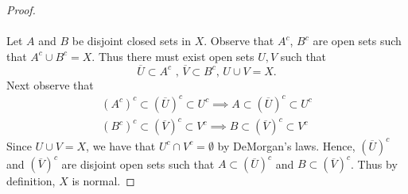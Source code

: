 \documentclass[a4paper,12pt,twoside]{hmcpset}
\begin{document}
\begin{proof}
\\
\\
Let $A$ and $B$ be disjoint closed sets in $X$. Observe that $A^c$,
$B^c$ are open sets such that $A^c \cup B^c = X$. Thus there must
exist open sets $U, V$ such that 
\[
  \overline{U} \subset A^c \text{ , } \overline{V} \subset B^c \text{, }
  U \cup V = X.  
\]
Next observe that 
\begin{gather*}
  (A^c)^c \subset (\overline{U})^c \subset U^c \implies A \subset (\overline{U})^c \subset U^c\\
  (B^c)^c \subset (\overline{V})^c \subset V^c \implies B \subset (\overline{V})^c \subset V^c 
\end{gather*}
Since $U \cup V = X$, we have that $U^c \cap V^c = \emptyset$ by
DeMorgan's laws. Hence, $(\overline{U})^c$ and $(\overline{V})^c$ are
disjoint open sets such that $A \subset (\overline{U})^c$ and 
$B \subset (\overline{V})^c$. Thus by definition, $X$ is normal.
\end{proof}
\end{document}
